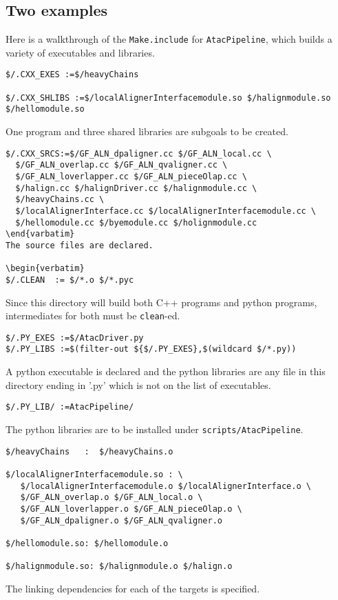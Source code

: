 \documentclass[letterpaper]{article}
\begin{document}
\subsection{Two examples}

Here is a walkthrough of the \verb+Make.include+ for
\verb+AtacPipeline+, which builds a variety of executables and
libraries.

\begin{verbatim}
$/.CXX_EXES :=$/heavyChains

$/.CXX_SHLIBS :=$/localAlignerInterfacemodule.so $/halignmodule.so $/hellomodule.so
\end{verbatim}
One program and three shared libraries are subgoals to be created.

\begin{verbatim}
$/.CXX_SRCS:=$/GF_ALN_dpaligner.cc $/GF_ALN_local.cc \
  $/GF_ALN_overlap.cc $/GF_ALN_qvaligner.cc \
  $/GF_ALN_loverlapper.cc $/GF_ALN_pieceOlap.cc \
  $/halign.cc $/halignDriver.cc $/halignmodule.cc \
  $/heavyChains.cc \
  $/localAlignerInterface.cc $/localAlignerInterfacemodule.cc \
  $/hellomodule.cc $/byemodule.cc $/holignmodule.cc
\end{varbatim}
The source files are declared.

\begin{verbatim}
$/.CLEAN  := $/*.o $/*.pyc
\end{verbatim}
Since this directory will build both C++ programs and python programs,
intermediates for both must be \verb+clean+-ed.

\begin{verbatim}
$/.PY_EXES :=$/AtacDriver.py
$/.PY_LIBS :=$(filter-out ${$/.PY_EXES},$(wildcard $/*.py))
\end{verbatim}
A python executable is declared and the python libraries are any file in
this directory ending in '.py' which is not on the list of executables.
\begin{verbatim}
$/.PY_LIB/ :=AtacPipeline/
\end{verbatim}
The python libraries are to be installed under \verb+scripts/AtacPipeline+.

\begin{verbatim}
$/heavyChains   :  $/heavyChains.o

$/localAlignerInterfacemodule.so : \
   $/localAlignerInterfacemodule.o $/localAlignerInterface.o \
   $/GF_ALN_overlap.o $/GF_ALN_local.o \
   $/GF_ALN_loverlapper.o $/GF_ALN_pieceOlap.o \
   $/GF_ALN_dpaligner.o $/GF_ALN_qvaligner.o

$/hellomodule.so: $/hellomodule.o

$/halignmodule.so: $/halignmodule.o $/halign.o
\end{verbatim}
The linking dependencies for each of the targets is specified.
\end{document}
